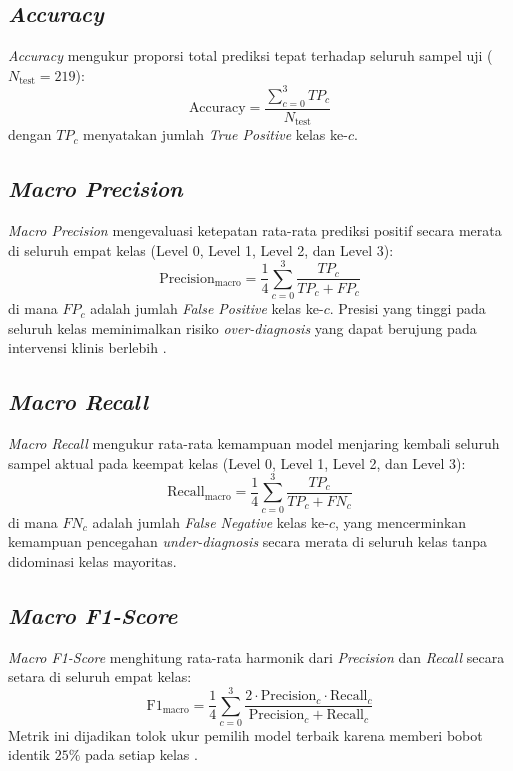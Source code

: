 \subsection{\textit{Accuracy}}
\textit{Accuracy} mengukur proporsi total prediksi tepat terhadap seluruh sampel uji ($N_{\text{test}} = 219$):
\begin{equation}
    \text{Accuracy} = \frac{\sum_{c=0}^{3} TP_c}{N_{\text{test}}}
\end{equation}
dengan $TP_c$ menyatakan jumlah \textit{True Positive} kelas ke-$c$.

\subsection{\textit{Macro Precision}}
\textit{Macro Precision} mengevaluasi ketepatan rata-rata prediksi positif secara merata di seluruh empat kelas (Level 0, Level 1, Level 2, dan Level 3):
\begin{equation}
    \text{Precision}_{\text{macro}} = \frac{1}{4} \sum_{c=0}^{3} \frac{TP_c}{TP_c + FP_c}
\end{equation}
di mana $FP_c$ adalah jumlah \textit{False Positive} kelas ke-$c$. Presisi yang tinggi pada seluruh kelas meminimalkan risiko \textit{over-diagnosis} yang dapat berujung pada intervensi klinis berlebih \cite{hayashi2008, lopez2023}.

\subsection{\textit{Macro Recall}}
\textit{Macro Recall} mengukur rata-rata kemampuan model menjaring kembali seluruh sampel aktual pada keempat kelas (Level 0, Level 1, Level 2, dan Level 3):
\begin{equation}
    \text{Recall}_{\text{macro}} = \frac{1}{4} \sum_{c=0}^{3} \frac{TP_c}{TP_c + FN_c}
\end{equation}
di mana $FN_c$ adalah jumlah \textit{False Negative} kelas ke-$c$, yang mencerminkan kemampuan pencegahan \textit{under-diagnosis} secara merata di seluruh kelas tanpa didominasi kelas mayoritas.

\subsection{\textit{Macro F1-Score}}
\textit{Macro F1-Score} menghitung rata-rata harmonik dari \textit{Precision} dan \textit{Recall} secara setara di seluruh empat kelas:
\begin{equation}
    \text{F1}_{\text{macro}} = \frac{1}{4}\sum_{c=0}^{3} \frac{2 \cdot \text{Precision}_c \cdot \text{Recall}_c}{\text{Precision}_c + \text{Recall}_c}
\end{equation}
Metrik ini dijadikan tolok ukur pemilih model terbaik karena memberi bobot identik $25\%$ pada setiap kelas \cite{davila2024, zeng2026}.


